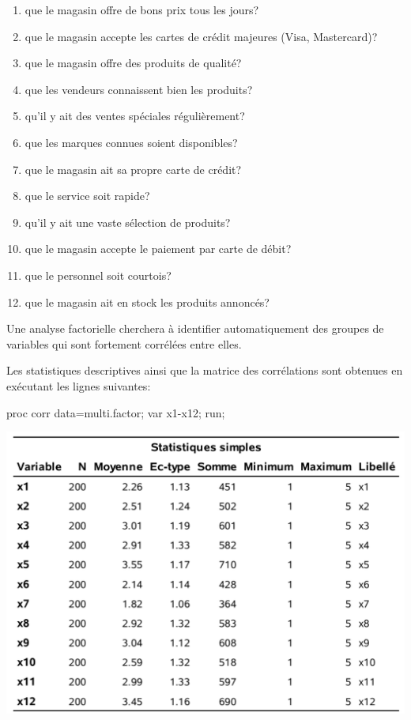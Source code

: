 \documentclass[
  11pt,
  letterpaper,
]{book}
\newenvironment{Shaded}{\begin{snugshade}}{\end{snugshade}}
\newcommand{\NormalTok}[1]{#1}
\providecommand{\tightlist}{%
  \setlength{\itemsep}{0pt}\setlength{\parskip}{0pt}}
\theoremstyle{definition}
\theoremstyle{definition}
\theoremstyle{definition}
\theoremstyle{definition}
\theoremstyle{remark}
\begin{document}
\begin{enumerate}
\def\labelenumi{\arabic{enumi}.}
\tightlist
\item
  que le magasin offre de bons prix tous les jours?
\item
  que le magasin accepte les cartes de crédit majeures (Visa, Mastercard)?
\item
  que le magasin offre des produits de qualité?
\item
  que les vendeurs connaissent bien les produits?
\item
  qu'il y ait des ventes spéciales régulièrement?
\item
  que les marques connues soient disponibles?
\item
  que le magasin ait sa propre carte de crédit?
\item
  que le service soit rapide?
\item
  qu'il y ait une vaste sélection de produits?
\item
  que le magasin accepte le paiement par carte de débit?
\item
  que le personnel soit courtois?
\item
  que le magasin ait en stock les produits annoncés?
\end{enumerate}

Une analyse factorielle cherchera à identifier automatiquement des groupes de variables qui sont fortement corrélées entre elles.

Les statistiques descriptives ainsi que la matrice des corrélations sont obtenues en exécutant les lignes suivantes:

\begin{Shaded}
\begin{Highlighting}[]
\NormalTok{proc corr data=multi.factor;}
\NormalTok{var x1{-}x12;}
\NormalTok{run;}
\end{Highlighting}
\end{Shaded}

\begin{center}\includegraphics[width=0.9\linewidth]{figures/01-facto-e1} \end{center}
\end{document}
